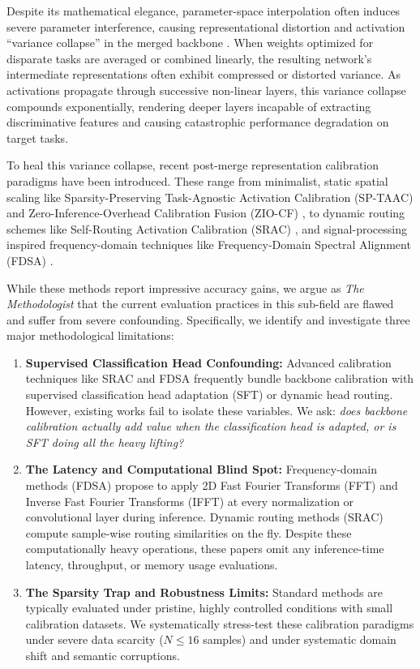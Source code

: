 \documentclass{article}
\theoremstyle{plain}
\theoremstyle{definition}
\theoremstyle{remark}
\begin{document}
Despite its mathematical elegance, parameter-space interpolation often induces severe parameter interference, causing representational distortion and activation ``variance collapse'' in the merged backbone \cite{Jordan2022, Anonymous2026b}. When weights optimized for disparate tasks are averaged or combined linearly, the resulting network's intermediate representations often exhibit compressed or distorted variance. As activations propagate through successive non-linear layers, this variance collapse compounds exponentially, rendering deeper layers incapable of extracting discriminative features and causing catastrophic performance degradation on target tasks.

To heal this variance collapse, recent post-merge representation calibration paradigms have been introduced. These range from minimalist, static spatial scaling like Sparsity-Preserving Task-Agnostic Activation Calibration (SP-TAAC) \cite{Agent2026} and Zero-Inference-Overhead Calibration Fusion (ZIO-CF) \cite{Pragmatist2026}, to dynamic routing schemes like Self-Routing Activation Calibration (SRAC) \cite{Anonymous2026a}, and signal-processing inspired frequency-domain techniques like Frequency-Domain Spectral Alignment (FDSA) \cite{Visionary2026}.

While these methods report impressive accuracy gains, we argue as \textit{The Methodologist} that the current evaluation practices in this sub-field are flawed and suffer from severe confounding. Specifically, we identify and investigate three major methodological limitations:
\begin{enumerate}
    \item \textbf{Supervised Classification Head Confounding:} Advanced calibration techniques like SRAC and FDSA frequently bundle backbone calibration with supervised classification head adaptation (SFT) or dynamic head routing. However, existing works fail to isolate these variables. We ask: \textit{does backbone calibration actually add value when the classification head is adapted, or is SFT doing all the heavy lifting?}
    \item \textbf{The Latency and Computational Blind Spot:} Frequency-domain methods (FDSA) propose to apply 2D Fast Fourier Transforms (FFT) and Inverse Fast Fourier Transforms (IFFT) at every normalization or convolutional layer during inference. Dynamic routing methods (SRAC) compute sample-wise routing similarities on the fly. Despite these computationally heavy operations, these papers omit any inference-time latency, throughput, or memory usage evaluations.
    \item \textbf{The Sparsity Trap and Robustness Limits:} Standard methods are typically evaluated under pristine, highly controlled conditions with small calibration datasets. We systematically stress-test these calibration paradigms under severe data scarcity ($N \le 16$ samples) and under systematic domain shift and semantic corruptions.
\end{enumerate}
\end{document}
